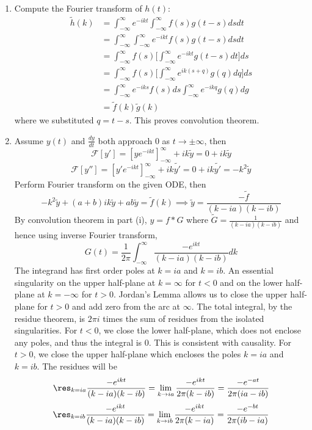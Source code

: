 \documentclass[a4paper]{article}
\begin{document}
\begin{ans}\leavevmode
\begin{enumerate}[label=(\roman*)]
\item Compute the Fourier transform of $h(t)$:
\begin{align}
    \tilde{h}(k)&=\int_{-\infty}^\infty e^{-ikt}\int_{-\infty}^\infty f(s)g(t-s)dsdt\nonumber\\&=\int_{-\infty}^\infty\int_{-\infty}^\infty e^{-ikt}f(s)g(t-s)dsdt\nonumber\\&=\int_{-\infty}^\infty f(s)\bigg[\int_{-\infty}^\infty e^{-ikt}g(t-s)dt\bigg]ds\nonumber\\&=\int_{-\infty}^\infty f(s)\bigg[\int_{-\infty}^\infty e^{ik(s+q)}g(q)dq\bigg]ds\nonumber\\&=\int_{-\infty}^\infty e^{-iks}f(s)ds\int_{-\infty}^\infty e^{-ikq}g(q)dg\nonumber\\&=\tilde{f}(k)\tilde{g}(k)\nonumber
\end{align}
where we substituted $q=t-s$. This proves convolution theorem.
\item Assume $y(t)$ and $\frac{dy}{dt}$ both approach 0 as $t\rightarrow\pm\infty$, then
$$\mathcal{F}[y']=[ye^{-ikt}]_{-\infty}^\infty +ik\tilde{y}=0+ik\tilde{y}$$
$$\mathcal{F}[y'']=[y'e^{-ikt}]_{-\infty}^\infty +ik\tilde{y'}=0+ik\tilde{y'}=-k^2\tilde{y}$$
Perform Fourier transform on the given ODE, then
$$-k^2\tilde{y}+(a+b)ik\tilde{y}+ab\tilde{y}=\tilde{f}(k)\implies\tilde{y}=\frac{-\tilde{f}}{(k-ia)(k-ib)}$$
By convolution theorem in part (i), $y=f*G$ where $\tilde{G}=\frac{1}{(k-ia)(k-ib)}$ and hence using inverse Fourier transform,
$$G(t)=\frac{1}{2\pi}\int_{-\infty}^\infty\frac{-e^{ikt}}{(k-ia)(k-ib)}dk$$
The integrand has first order poles at $k=ia$ and $k=ib$. An essential singularity on the upper half-plane at $k=\infty$ for $t<0$ and on the lower half-plane at $k=-\infty$ for $t>0$. Jordan's Lemma allows us to close the upper half-plane for $t>0$ and add zero from the arc at $\infty$. The total integral, by the residue theorem, is $2\pi i$ times the sum of residues from the isolated singularities. For $t<0$, we close the lower half-plane, which does not enclose any poles, and thus the integral is 0. This is consistent with causality. For $t>0$, we close the upper half-plane which encloses the poles $k=ia$ and $k=ib$. The residues will be
$$\res_{k=ia}\frac{-e^{ikt}}{(k-ia)(k-ib)}=\lim_{k\rightarrow ia}\frac{-e^{ikt}}{2\pi(k-ib)}=\frac{-e^{-at}}{2\pi(ia-ib)}$$
$$\res_{k=ib}\frac{-e^{ikt}}{(k-ia)(k-ib)}=\lim_{k\rightarrow ib}\frac{-e^{ikt}}{2\pi(k-ia)}=\frac{-e^{-bt}}{2\pi(ib-ia)}$$

\end{enumerate}
\end{ans}
\end{document}
